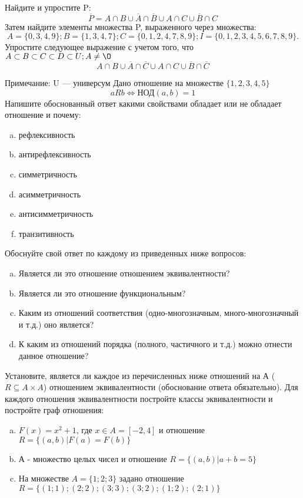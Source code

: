 \documentclass[10pt]{exam}
\begin{document}
\begin{questions}
\question
Найдите и упростите P:
\begin{equation*}
\overline{P} = A \cap B \cup \overline{A} \cap \overline{B} \cup A \cap C \cup \overline{B} \cap C
\end{equation*}
Затем найдите элементы множества P, выраженного через множества:
\begin{equation*}
A = \{0, 3, 4, 9\}; 
B = \{1, 3, 4, 7\};
C = \{0, 1, 2, 4, 7, 8, 9\};
I = \{0, 1, 2, 3, 4, 5, 6, 7, 8, 9\}.
\end{equation*}\question
Упростите следующее выражение с учетом того, что $A\subset B \subset C \subset D \subset U; A \neq \O$
\begin{equation*}
A \cap B \cup \overline{A} \cap \overline{C} \cup A \cap C \cup \overline{B} \cap \overline{C}
\end{equation*}

Примечание: U — универсум\question
Дано отношение на множестве $\{1, 2, 3, 4, 5\}$ 
\begin{equation*}
aRb \iff  \text{НОД}(a,b) =1
\end{equation*}
Напишите обоснованный ответ какими свойствами обладает или не обладает отношение и почему:   
\begin{enumerate} [a)]\setcounter{enumi}{0}
\item рефлексивность
\item антирефлексивность
\item симметричность
\item асимметричность
\item антисимметричность
\item транзитивность
\end{enumerate}

Обоснуйте свой ответ по каждому из приведенных ниже вопросов:
\begin{enumerate} [a)]\setcounter{enumi}{0}
    \item Является ли это отношение отношением эквивалентности?
    \item Является ли это отношение функциональным?
    \item Каким из отношений соответствия (одно-многозначным, много-многозначный и т.д.) оно является?
    \item К каким из отношений порядка (полного, частичного и т.д.) можно отнести данное отношение?
\end{enumerate}


\question
Установите, является ли каждое из перечисленных ниже отношений на А ($R \subseteq A \times A$) отношением эквивалентности (обоснование ответа обязательно). Для каждого отношения эквивалентности постройте классы эквивалентности и постройте граф отношения:
\begin{enumerate} [a)]\setcounter{enumi}{0}
\item $F(x)=x^{2}+1$, где $x \in A = [-2, 4]$ и отношение $R = \{(a,b)|F(a) = F(b)\}$
\item А - множество целых чисел и отношение $R = \{(a,b)|a + b = 5\}$
\item На множестве $A = \{1; 2; 3\}$ задано отношение $R = \{(1; 1); (2; 2); (3; 3); (3; 2); (1; 2); (2; 1)\}$


\end{enumerate}
\end{questions}
\end{document}
